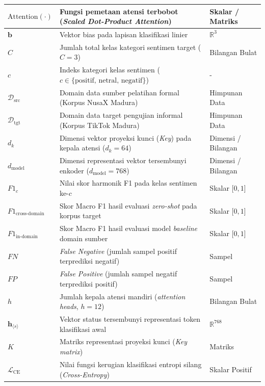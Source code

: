 \begin{longtable}{|>{\centering\arraybackslash}p{2.4cm}|>{\raggedright\arraybackslash}p{8.0cm}|>{\centering\arraybackslash}p{2.6cm}|}
    $\text{Attention}(\cdot)$ & Fungsi pemetaan atensi terbobot (\textit{Scaled Dot-Product Attention}) & Skalar / Matriks \\
    \hline
    $\mathbf{b}$ & Vektor bias pada lapisan klasifikasi linier & $\mathbb{R}^{3}$ \\
    \hline
    $C$ & Jumlah total kelas kategori sentimen target ($C = 3$) & Bilangan Bulat \\
    \hline
    $c$ & Indeks kategori kelas sentimen ($c \in \{\text{positif, netral, negatif}\}$) & - \\
    \hline
    $\mathcal{D}_{\text{src}}$ & Domain data sumber pelatihan formal (Korpus NusaX Madura) & Himpunan Data \\
    \hline
    $\mathcal{D}_{\text{tgt}}$ & Domain data target pengujian informal (Korpus TikTok Madura) & Himpunan Data \\
    \hline
    $d_k$ & Dimensi vektor proyeksi kunci (\textit{Key}) pada kepala atensi ($d_k = 64$) & Dimensi / Bilangan \\
    \hline
    $d_{\text{model}}$ & Dimensi representasi vektor tersembunyi enkoder ($d_{\text{model}} = 768$) & Dimensi / Bilangan \\
    \hline
    $F1_c$ & Nilai skor harmonik F1 pada kelas sentimen ke-$c$ & Skalar [$0, 1$] \\
    \hline
    $F1_{\text{cross-domain}}$ & Skor Macro F1 hasil evaluasi \textit{zero-shot} pada korpus target & Skalar [$0, 1$] \\
    \hline
    $F1_{\text{in-domain}}$ & Skor Macro F1 hasil evaluasi model \textit{baseline} domain sumber & Skalar [$0, 1$] \\
    \hline
    $FN$ & \textit{False Negative} (jumlah sampel positif terprediksi negatif) & Sampel \\
    \hline
    $FP$ & \textit{False Positive} (jumlah sampel negatif terprediksi positif) & Sampel \\
    \hline
    $h$ & Jumlah kepala atensi mandiri (\textit{attention heads}, $h = 12$) & Bilangan Bulat \\
    \hline
    $\mathbf{h}_{\langle s \rangle}$ & Vektor status tersembunyi representasi token klasifikasi awal & $\mathbb{R}^{768}$ \\
    \hline
    $K$ & Matriks representasi proyeksi kunci (\textit{Key matrix}) & Matriks \\
    \hline
    $\mathcal{L}_{\text{CE}}$ & Nilai fungsi kerugian klasifikasi entropi silang (\textit{Cross-Entropy}) & Skalar Positif \\

\end{longtable}
